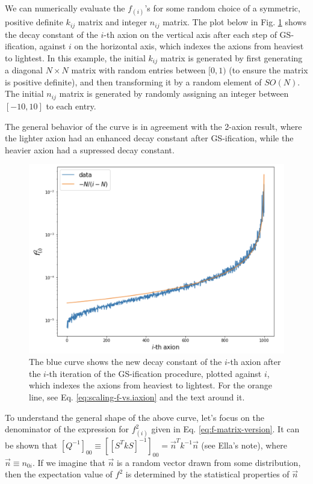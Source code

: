 \documentclass[11pt]{article}
\begin{document}
We can numerically evaluate the $f_{(i)}$'s for some random choice of a symmetric, positive definite $k_{ij}$ matrix and integer $n_{ij}$ matrix. The plot below in Fig. \ref{fig:f-vs-axions} shows the decay constant of the $i$-th axion on the vertical axis after each step of GS-ification, against $i$ on the horizontal axis, which indexes the axions from heaviest to lightest. In this example, the initial $k_{ij}$ matrix is generated by first generating a diagonal $N\times N$ matrix with random entries between $[0,1)$ (to ensure the matrix is positive definite), and then transforming it by a random element of $SO(N)$. The initial $n_{ij}$ matrix is generated by randomly assigning an integer between $[-10,10]$ to each entry.

The general behavior of the curve is in agreement with the 2-axion result, where the lighter axion had an enhanced decay constant after GS-ification, while the heavier axion had a supressed decay constant.

\begin{figure}[h]
    \centering
    \includegraphics[width=0.9\linewidth]{figs/f-vs-axions.png}
    \caption{The blue curve shows the new decay constant of the $i$-th axion after the $i$-th iteration of the GS-ification procedure, plotted against $i$, which indexes the axions from heaviest to lightest. For the orange line, see Eq. \eqref{eq:scaling-f-vs.iaxion} and the text around it.}
    \label{fig:f-vs-axions}
\end{figure}

To understand the general shape of the above curve, let's focus on the denominator of the expression for $f_{(i)}^{2}$ given in Eq. \eqref{eq:f-matrix-version}. It can be shown that $[Q^{-1}]_{00} \equiv [[S^T k S]^{-1}]_{00} = \vec{n}^T k^{-1} \vec{n}$ (see Ella's note), where $\vec{n} \equiv n_{0i}$. If we imagine that $\vec n$ is a random vector drawn from some distribution, then the expectation value of $f^{2}$ is determined by the statistical properties of $\vec n$
\end{document}
